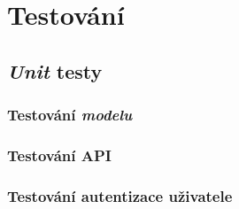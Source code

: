 \chapter{Testování}
\label{sec:te}

\section{\textit{Unit} testy}


\subsection{Testování \textit{modelu}}

\subsection{Testování API}

\subsection{Testování autentizace uživatele}
